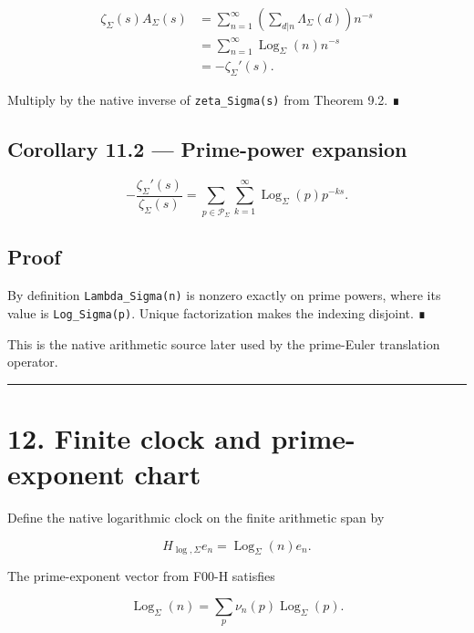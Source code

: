 \[
\begin{aligned}
\zeta_\Sigma(s)A_\Sigma(s)
&=
\sum_{n=1}^{\infty}
\left(
\sum_{d|n}\Lambda_\Sigma(d)
\right)n^{-s}\\
&=
\sum_{n=1}^{\infty}
\operatorname{Log}_\Sigma(n)n^{-s}\\
&=-\zeta_\Sigma'(s).
\end{aligned}
\]

Multiply by the native inverse of \texttt{zeta\_Sigma(s)} from Theorem 9.2. ∎

\hypertarget{corollary-11.2-prime-power-expansion}{%
\subsection{Corollary 11.2 --- Prime-power expansion}\label{corollary-11.2-prime-power-expansion}}

\[
\boxed{
-
\frac{\zeta_\Sigma'(s)}{\zeta_\Sigma(s)}
=
\sum_{p\in\mathcal P_\Sigma}
\sum_{k=1}^{\infty}
\operatorname{Log}_\Sigma(p)p^{-ks}.
}
\]

\hypertarget{proof-16}{%
\subsection{Proof}\label{proof-16}}

By definition \texttt{Lambda\_Sigma(n)} is nonzero exactly on prime powers, where its
value is \texttt{Log\_Sigma(p)}. Unique factorization makes the indexing disjoint. ∎

This is the native arithmetic source later used by the prime-Euler translation
operator.

\begin{center}\rule{0.5\linewidth}{0.5pt}\end{center}

\hypertarget{finite-clock-and-prime-exponent-chart}{%
\section{12. Finite clock and prime-exponent chart}\label{finite-clock-and-prime-exponent-chart}}

Define the native logarithmic clock on the finite arithmetic span by

\[
H_{\log,\Sigma}e_n
=
\operatorname{Log}_\Sigma(n)e_n.
\]

The prime-exponent vector from F00-H satisfies

\[
\operatorname{Log}_\Sigma(n)
=
\sum_p\nu_n(p)\operatorname{Log}_\Sigma(p).
\]

